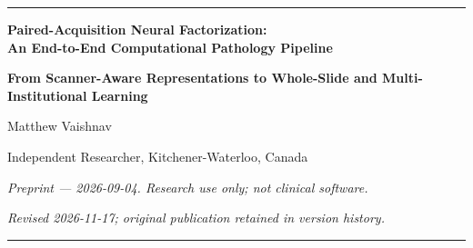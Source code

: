 \documentclass[10pt,letterpaper]{article}
\begin{document}
\begin{center}
\rule{\linewidth}{4pt}
\vspace{0.22in}

{\LARGE\bfseries Paired-Acquisition Neural Factorization:\\ An End-to-End Computational Pathology Pipeline\par}
\vspace{0.08in}
{\large\bfseries From Scanner-Aware Representations to Whole-Slide and Multi-Institutional Learning\par}

\vspace{0.16in}
{\large Matthew Vaishnav\par}
\vspace{0.08in}
{\normalsize Independent Researcher, Kitchener-Waterloo, Canada\par}
{\normalsize\em Preprint --- 2026-09-04. Research use only; not clinical software.\par}
{\small\em Revised 2026-11-17; original publication retained in version history.\par}

\vspace{0.22in}
\rule{\linewidth}{1pt}
\end{center}



















\end{document}
